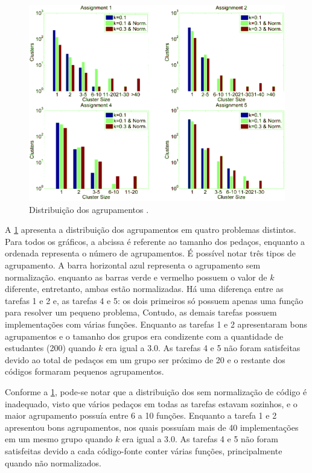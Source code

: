 		\begin{figure}
			\centering
			\includegraphics[width=0.7\linewidth]{imagem/clusteringPerformance}
			\captionsetup{justification=centering}
			\caption{Distribuição dos agrupamentos \cite{Wei2015}.}
			\label{fig:clusteringPerformance}
		\end{figure}
	    
		A \cref{fig:clusteringPerformance} apresenta a distribuição dos
		agrupamentos em quatro problemas distintos. Para todos os gráficos, a
		abcissa é referente ao tamanho dos pedaços, enquanto a ordenada representa
		o número de agrupamentos. É possível notar três tipos de agrupamento. A barra
		horizontal azul representa o agrupamento sem normalização. enquanto as barras
		verde e vermelho possuem o valor de $k$ diferente, entretanto, ambas estão
		normalizadas. Há uma diferença entre as tarefas 1 e 2 e, as tarefas 4 e 5:
		os dois primeiros só possuem apenas uma função para resolver um pequeno problema,
		Contudo, as demais tarefas possuem implementações com várias funções. Enquanto
		as tarefas 1 e 2 apresentaram bons agrupamentos e o tamanho dos grupos era
		condizente com a quantidade de estudantes (200) quando $k$ era igual a 3.0.
		As tarefas 4 e 5 não foram satisfeitas devido ao total de pedaços em um grupo
		ser próximo de 20 e o restante dos códigos formaram pequenos agrupamentos.
		
		Conforme a \cref{fig:clusteringPerformance}, pode-se notar que a
		distribuição dos  sem normalização de código é inadequado,
		visto que vários pedaços em todas as tarefas estavam sozinhos, e o maior
		agrupamento possuía entre 6 a 10 funções. Enquanto a tarefa 1 e 2 apresentou
		bons agrupamentos, nos quais possuíam mais de 40 implementações em um mesmo
		grupo quando $k$ era igual a 3.0. As tarefas 4 e 5 não foram satisfeitas devido
		a cada código-fonte conter várias funções, principalmente quando não normalizados.
		
